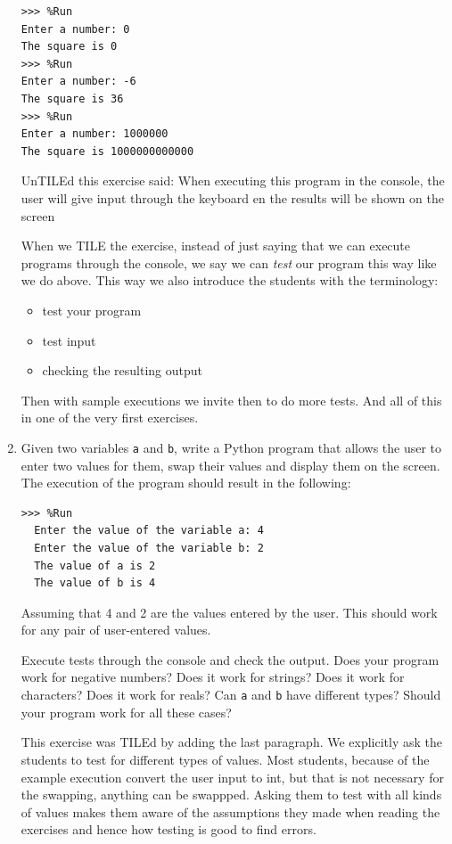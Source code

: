 \documentclass[
  fontsize=10pt,
  a4paper,
]{scrartcl}
\newenvironment{howTILEd}%
  {\begin{mdframed}[skipabove=10pt,skipbelow=10pt,backgroundcolor=pink!40]}%
  {\end{mdframed}}
\begin{document}
\begin{enumerate}
\begin{Verbatim}[frame=single, label={\em do more tests}]
>>> %Run 
Enter a number: 0
The square is 0
>>> %Run 
Enter a number: -6
The square is 36
>>> %Run 
Enter a number: 1000000
The square is 1000000000000
\end{Verbatim}

\begin{howTILEd}
UnTILEd this exercise said: When executing this program in the console, the user will give input through the keyboard en the results will be shown on the screen

When we TILE the exercise, instead of just saying that we can execute programs through the console, we say we can {\em test} our program this way like we do above. This way we also introduce the students with the terminology:

\begin{itemize}
    \item test your program
    \item test input
    \item checking the resulting output
\end{itemize}

Then with sample executions we invite then to do more tests.
And all of this in one of the very first exercises.
\end{howTILEd}


\item Given two variables \verb+a+ and \verb+b+, write a Python program that allows the user to enter two values for them, swap their values and display them on the
screen. The execution of the program should result in the following:
\begin{Verbatim}[frame=single, label={\em example test execution of the program}]
>>> %Run
  Enter the value of the variable a: 4
  Enter the value of the variable b: 2
  The value of a is 2
  The value of b is 4
\end{Verbatim}
Assuming that 4 and 2 are the values entered by the user. This should work for any pair of user-entered values.

Execute tests through the console and check the output. Does your program work for negative numbers? Does it work for strings? Does it work for characters? Does it work for reals? Can \verb+a+ and \verb+b+ have different types? Should your program work for all these cases?

\begin{howTILEd}
This exercise was TILEd by adding the last paragraph. We explicitly ask the students to test for different types of values. Most students, because of the example execution convert the user input to int, but that is not necessary for the swapping, anything can be swappped. Asking them to test with all kinds of values makes them aware of the assumptions they made when reading the exercises and hence how testing is good to find errors.
\end{howTILEd}




\end{enumerate}
\end{document}
